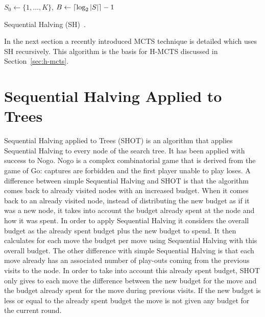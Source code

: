 \documentclass[a4paper]{llncs}
\DeclarePairedDelimiter{\ceil}{\lceil}{\rceil}
\DeclarePairedDelimiter{\floor}{\lfloor}{\rfloor}
\begin{document}
\IncMargin{1em}
\begin{algorithm2e}[ht]
	\vspace{0.1cm}
	$S_0 \gets \{1,\dots,K\}$,
	$B \gets \ceil{\log_2{|S|}} - 1$														\;
	\BlankLine
  \caption[Sequential Halving]{Sequential Halving (SH)~\protect\cite{Karnin13SH}. \label{alg:seqhalv}}
\end{algorithm2e}
\DecMargin{1em}

In the next section a recently introduced MCTS technique is detailed which uses SH recursively. This algorithm is the basis for H-MCTS discussed in Section~\ref{sec:h-mcts}.

\section{Sequential Halving Applied to Trees}
\label{sec:shot}

Sequential Halving applied to Trees (SHOT) \cite{Cazenave14SHOT} is an
algorithm that applies Sequential Halving to every node of the search
tree. It has been applied with success to Nogo. Nogo is a complex
combinatorial game that is derived from the game of Go: captures are
forbidden and the first player unable to play loses. 
A difference between simple Sequential Halving and SHOT is that the algorithm comes
back to already visited nodes with an increased budget. When it comes
back to an already visited node, instead of distributing the new
budget as if it was a new node, it takes into account the budget
already spent at the node and how it was spent. In order to apply
Sequential Halving it considers the overall budget as the already
spent budget plus the new budget to spend. It then calculates for each
move the budget per move using Sequential Halving with this overall
budget. The other difference with simple Sequential Halving is that
each move already has an associated number of play-outs coming from the
previous visits to the node. In order to take into account this
already spent budget, SHOT only gives to each move the difference
between the new budget for the move and the budget already spent for
the move during previous visits. If the new budget is less or equal to
the already spent budget the move is not given any budget for the
current round.
\end{document}
